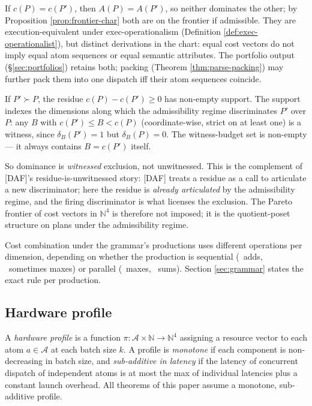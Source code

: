 \begin{remark}
  If $c(P) = c(P')$, then $A(P) = A(P')$, so neither
  dominates the other; by
  Proposition \ref{prop:frontier-char} both are on
  the frontier if admissible. They are
  execution-equivalent under exec-operationalism
  (Definition \ref{def:exec-operationalist}), but
  distinct derivations in the chart: equal cost
  vectors do not imply equal atom sequences or equal
  semantic attributes. The portfolio output
  (\S\ref{sec:portfolios}) retains both; packing
  (Theorem \ref{thm:parse-packing}) may further pack
  them into one dispatch iff their atom sequences
  coincide.
\end{remark}

\begin{remark}
  \label{rem:witnessed-residue}
  If $P' \succ P$, the residue $c(P) - c(P') \geq 0$
  has non-empty support. The support indexes the
  dimensions along which the admissibility regime
  discriminates $P'$ over $P$: any $B$ with
  $c(P') \leq B < c(P)$ (coordinate-wise, strict on
  at least one) is a witness, since $\delta_B(P') =
  1$ but $\delta_B(P) = 0$. The witness-budget set
  is non-empty --- it always contains $B = c(P')$
  itself.

  So dominance is \emph{witnessed} exclusion, not
  unwitnessed. This is the complement of [DAF]'s
  residue-is-unwitnessed story: [DAF] treats a
  residue as a call to articulate a new
  discriminator; here the residue is
  \emph{already articulated} by the admissibility
  regime, and the firing discriminator is what
  licenses the exclusion. The Pareto frontier of
  cost vectors in $\mathbb{N}^4$ is therefore not
  imposed; it is the quotient-poset structure on
  plans under the admissibility regime.
\end{remark}

Cost combination under the grammar's productions uses
different operations per dimension, depending on
whether the production is sequential (\LAT\ adds,
\REG\ sometimes maxes) or parallel (\LAT\ maxes,
\REG\ sums). Section \ref{sec:grammar} states the
exact rule per production.

\subsection{Hardware profile}\label{sec:profile}

\begin{definition}\label{def:profile}
  A \emph{hardware profile} is a function $\pi: \mathcal{A}
  \times \mathbb{N} \to \mathbb{N}^4$ assigning a
  resource vector to each atom $a \in \mathcal{A}$
  at each batch size $k$. A profile is \emph{monotone}
  if each component is non-decreasing in batch size,
  and \emph{sub-additive in latency} if the latency of
  concurrent dispatch of independent atoms is at most
  the max of individual latencies plus a constant
  launch overhead. All theorems of this paper assume
  a monotone, sub-additive profile.
\end{definition}

